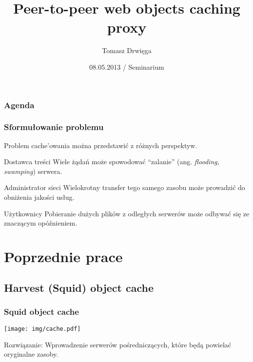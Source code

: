 \documentclass{beamer}
\title{Peer-to-peer web objects caching proxy}
\author{Tomasz Drwięga}
\date{08.05.2013 / Seminarium}
\begin{document}
\begin{frame}
\titlepage
\end{frame}

\begin{frame}
\frametitle{Agenda}
\tableofcontents
\end{frame}



\begin{frame}
\frametitle{Sformułowanie problemu}
Problem cache'owania można przedstawić z różnych perspektyw.

\begin{block}{Dostawca treści}
Wiele żądań może spowodować ``zalanie'' (ang. \textit{flooding, swamping}) serwera.
\end{block}
\begin{block}{Administrator sieci}
Wielokrotny transfer tego samego zasobu może prowadzić do obniżenia jakości usług.
\end{block}
\begin{block}{Użytkownicy}
Pobieranie dużych plików z odległych serwerów może odbywać się ze znaczącym opóźnieniem.
\end{block}
\end{frame}


\section{Poprzednie prace}
\subsection{Harvest (Squid) object cache}

\begin{frame}
\frametitle{Squid object cache}
\centering
\texttt{[image: img/cache.pdf]}

\begin{block}{}
Rozwiązanie: Wprowadzenie serwerów pośredniczących, które będą powielać oryginalne zasoby.
\end{block}

\end{frame}
\end{document}
